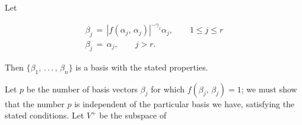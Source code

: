 Let

\[\begin{array}{l}\beta_{j}\,=\,|f(\alpha_{j},\,\alpha_{j})|^{-\gamma_{j}}\alpha_{ j},\qquad 1\leq j\leq r\\ \beta_{j}\,=\,\alpha_{j},\qquad j>r.\end{array}\]

Then \(\{\beta_{1},\,.\,.\,.\,,\,\beta_{n}\}\) is a basis with the stated properties.

Let \(p\) be the number of basis vectors \(\beta_{j}\) for which \(f(\beta_{j},\,\beta_{j})=1\); we must show that the number \(p\) is independent of the particular basis we have, satisfying the stated conditions. Let \(V^{+}\) be the subspace of 